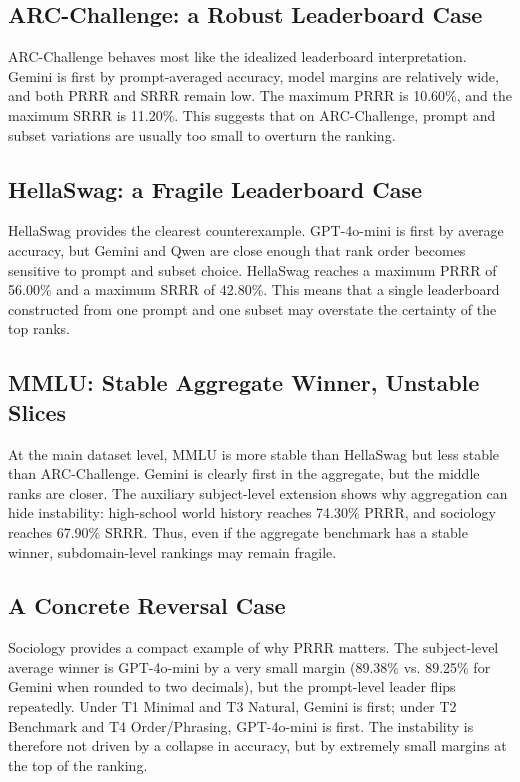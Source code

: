 \documentclass[11pt]{article}
\begin{document}
\subsection{ARC-Challenge: a Robust Leaderboard Case}

ARC-Challenge behaves most like the idealized leaderboard interpretation. Gemini is first by prompt-averaged accuracy, model margins are relatively wide, and both PRRR and SRRR remain low. The maximum PRRR is 10.60\%, and the maximum SRRR is 11.20\%. This suggests that on ARC-Challenge, prompt and subset variations are usually too small to overturn the ranking.

\subsection{HellaSwag: a Fragile Leaderboard Case}

HellaSwag provides the clearest counterexample. GPT-4o-mini is first by average accuracy, but Gemini and Qwen are close enough that rank order becomes sensitive to prompt and subset choice. HellaSwag reaches a maximum PRRR of 56.00\% and a maximum SRRR of 42.80\%. This means that a single leaderboard constructed from one prompt and one subset may overstate the certainty of the top ranks.

\subsection{MMLU: Stable Aggregate Winner, Unstable Slices}

At the main dataset level, MMLU is more stable than HellaSwag but less stable than ARC-Challenge. Gemini is clearly first in the aggregate, but the middle ranks are closer. The auxiliary subject-level extension shows why aggregation can hide instability: high-school world history reaches 74.30\% PRRR, and sociology reaches 67.90\% SRRR. Thus, even if the aggregate benchmark has a stable winner, subdomain-level rankings may remain fragile.

\subsection{A Concrete Reversal Case}

Sociology provides a compact example of why PRRR matters. The subject-level average winner is GPT-4o-mini by a very small margin (89.38\% vs. 89.25\% for Gemini when rounded to two decimals), but the prompt-level leader flips repeatedly. Under T1 Minimal and T3 Natural, Gemini is first; under T2 Benchmark and T4 Order/Phrasing, GPT-4o-mini is first. The instability is therefore not driven by a collapse in accuracy, but by extremely small margins at the top of the ranking.
\end{document}
